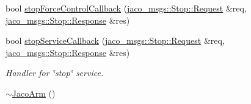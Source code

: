 \begin{DoxyCompactItemize}
bool \hyperlink{classjaco_1_1JacoArm_a0ddc9f2458a2c5e17e095b03b72699dc}{stop\+Force\+Control\+Callback} (\hyperlink{namespacejaco__msgs_a5c2942c9b9b1fe5330e2b79bfaef2847}{jaco\+\_\+msgs\+::\+Stop\+::\+Request} \&req, \hyperlink{namespacejaco__msgs_aad03f8a7d16be1d6f6a0c1b2faf9cef2}{jaco\+\_\+msgs\+::\+Stop\+::\+Response} \&res)
\item 
bool \hyperlink{classjaco_1_1JacoArm_a14ddcea579804fbbd3fb11643bc91e78}{stop\+Service\+Callback} (\hyperlink{namespacejaco__msgs_a5c2942c9b9b1fe5330e2b79bfaef2847}{jaco\+\_\+msgs\+::\+Stop\+::\+Request} \&req, \hyperlink{namespacejaco__msgs_aad03f8a7d16be1d6f6a0c1b2faf9cef2}{jaco\+\_\+msgs\+::\+Stop\+::\+Response} \&res)
\begin{DoxyCompactList}\small\item\em Handler for \char`\"{}stop\char`\"{} service. \end{DoxyCompactList}\item 
\hyperlink{classjaco_1_1JacoArm_a77535c062ca1d8e11b11e691bb1ee0da}{$\sim$\+Jaco\+Arm} ()
\end{DoxyCompactItemize}
